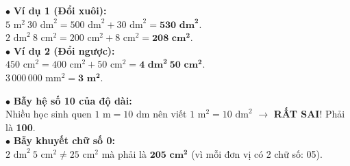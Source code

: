 \documentclass[14pt,a4paper,oneside]{extbook}
\begin{document}
\noindent
\begin{minipage}[t]{0.53\textwidth}
  \begin{tcolorbox}[
    enhanced,
    title={\footnotesize\bfseries\color{white}\faCheckCircle\ Ví dụ thực hành chuẩn mực},
    colback=green!2!white,
    colframe=green!60!black,
    arc=2.5mm, boxrule=0.8pt, top=1.8mm, bottom=1.8mm, left=2.2mm, right=2.2mm
  ]
    \footnotesize
    $\bullet$ \textbf{Ví dụ 1 (Đổi xuôi):}\\
    $5\text{ m}^2\ 30\text{ dm}^2 = 500\text{ dm}^2 + 30\text{ dm}^2 = \mathbf{530\text{ dm}^2}$.\\
    $2\text{ dm}^2\ 8\text{ cm}^2 = 200\text{ cm}^2 + 8\text{ cm}^2 = \mathbf{208\text{ cm}^2}$.\\
    $\bullet$ \textbf{Ví dụ 2 (Đổi ngược):}\\
    $450\text{ cm}^2 = 400\text{ cm}^2 + 50\text{ cm}^2 = \mathbf{4\text{ dm}^2\ 50\text{ cm}^2}$.\\
    $3\,000\,000\text{ mm}^2 = \mathbf{3\text{ m}^2}$.
  \end{tcolorbox}
\end{minipage}%
\hfill
\begin{minipage}[t]{0.45\textwidth}
  \begin{tcolorbox}[
    enhanced,
    title={\footnotesize\bfseries\color{white}\faExclamationTriangle\ Mẹo tránh bẫy trắc nghiệm},
    colback=red!2!white,
    colframe=red!70!black,
    arc=2.5mm, boxrule=0.8pt, top=1.8mm, bottom=1.8mm, left=2.2mm, right=2.2mm
  ]
    \footnotesize
    $\bullet$ \textbf{Bẫy hệ số 10 của độ dài:}\\
    Nhiều học sinh quen $1\text{ m} = 10\text{ dm}$ nên viết $1\text{ m}^2 = 10\text{ dm}^2$ $\rightarrow$ \textbf{RẤT SAI}! Phải là \textbf{100}.\\
    $\bullet$ \textbf{Bẫy khuyết chữ số 0:}\\
    $2\text{ dm}^2\ 5\text{ cm}^2 \ne 25\text{ cm}^2$ mà phải là $\mathbf{205\text{ cm}^2}$ (vì mỗi đơn vị có 2 chữ số: 05).
  \end{tcolorbox}
\end{minipage}
\end{document}
